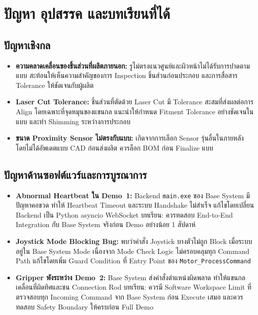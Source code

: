 \section{ปัญหา อุปสรรค และบทเรียนที่ได้}
\label{sec:lessons_learned}

\subsection{ปัญหาเชิงกล}
\label{subsec:mech_lessons}

\begin{itemize}
  \item \textbf{ความคลาดเคลื่อนของชิ้นส่วนที่ผลิตภายนอก:}
        รูไม่ตรงแนวศูนย์และผิวหน้าไม่ได้รับการปาดตามแบบ
        สะท้อนให้เห็นความสำคัญของการ Inspection
        ชิ้นส่วนก่อนประกอบ และการสื่อสาร Tolerance ให้ชัดเจนกับผู้ผลิต

  \item \textbf{Laser Cut Tolerance:}
        ชิ้นส่วนที่ตัดด้วย Laser Cut มี Tolerance สะสมที่ส่งผลต่อการ Align
        โดยเฉพาะที่จุดหมุนของแขนกล
        แนะนำให้กำหนด Fitment Tolerance อย่างชัดเจนในแบบ
        และทำ Shimming ระหว่างการประกอบ

  \item \textbf{ขนาด Proximity Sensor ไม่ตรงกับแบบ:}
        เกิดจากการเลือก Sensor รุ่นอื่นในภายหลัง
        โดยไม่ได้อัพเดตแบบ CAD ก่อนส่งผลิต
        ควรล็อก BOM ก่อน Finalize แบบ
\end{itemize}

\subsection{ปัญหาด้านซอฟต์แวร์และการบูรณาการ}
\label{subsec:sw_lessons}

\begin{itemize}
  \item \textbf{Abnormal Heartbeat ใน Demo~1:}
        Backend \texttt{main.exe} ของ Base System มีปัญหาคอขวด
        ทำให้ Heartbeat Timeout และระบบ Handshake ไม่สำเร็จ
        แก้ไขโดยเปลี่ยน Backend เป็น Python asyncio WebSocket
        บทเรียน: ควรทดสอบ End-to-End Integration
        กับ Base System จริงก่อน Demo อย่างน้อย 1 สัปดาห์

  \item \textbf{Joystick Mode Blocking Bug:}
        พบว่าคำสั่ง Joystick บางตัวไม่ถูก Block
        เมื่อระบบอยู่ใน Base System Mode
        เนื่องจาก Mode Check Logic ไม่ครอบคลุมทุก Command Path
        แก้ไขโดยเพิ่ม Guard Condition ที่ Entry Point ของ
        \texttt{Motor\_ProcessCommand}

  \item \textbf{Gripper พังระหว่าง Demo~2:}
        Base System ส่งคำสั่งตำแหน่งผิดพลาด
        ทำให้แขนกลเคลื่อนที่ผิดทิศและชน Connection Rod
        บทเรียน: ควรมี Software Workspace Limit
        ที่ตรวจสอบทุก Incoming Command จาก Base System
        ก่อน Execute เสมอ
        และควรทดสอบ Safety Boundary ให้ครบก่อน Full Demo
\end{itemize}

